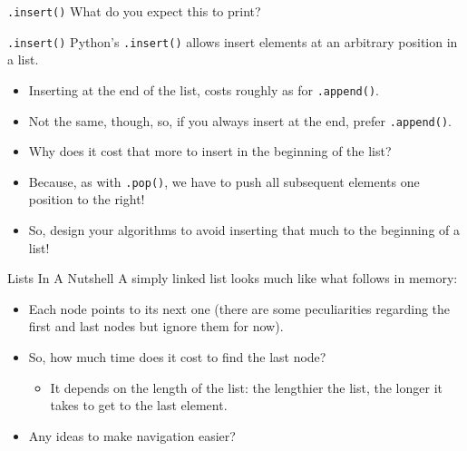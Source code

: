 \documentclass[aspectratio=169, 12pt, xcolor=table]{beamer}
\begin{document}
	\begin{frame}{\texttt{.insert()}}
		What do you expect this to print?
		
	\end{frame}

	\begin{frame}{\texttt{.insert()}}
		Python's \texttt{.insert()} allows insert elements at an arbitrary position in a list.
		\begin{itemize}
			\item Inserting at the end of the list, costs roughly as for \texttt{.append()}.\pause
			\item Not the same, though, so, if you always insert at the end, prefer \texttt{.append()}.\pause
			\item Why does it cost that more to insert in the beginning of the list?\pause
			\item Because, as with \texttt{.pop()}, we have to push all subsequent elements one position to the right!\pause
			\item So, design your algorithms to avoid inserting that much to the beginning of a list!
		\end{itemize}
	\end{frame}

	\begin{irrelevant}{Lists In A Nutshell}
		A simply linked list looks much like what follows in memory:
		\begin{center}
		\end{center}\pause
		\begin{itemize}
			\item Each node points to its next one (there are some peculiarities regarding the first and last nodes but ignore them for now).\pause
			\item So, how much time does it cost to find the last node?\pause
			\begin{itemize}
				\item It depends on the length of the list: the lengthier the list, the longer it takes to get to the last element.\pause
			\end{itemize}
			\item Any ideas to make navigation easier?
		\end{itemize}
	\end{irrelevant}
\end{document}
